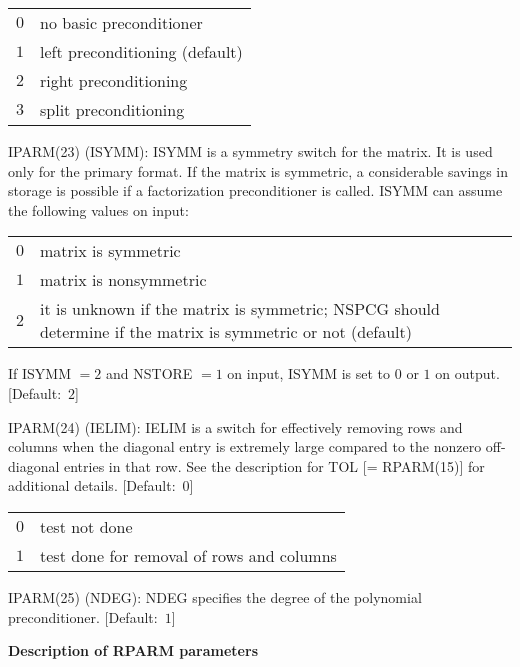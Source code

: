 \begin{list}{}{
               \leftmargin 1.00in \rightmargin 0.25in}
         \begin{tabular}{ll}
            $0$ & no basic preconditioner \\
            $1$ & left preconditioning (default) \\
            $2$ & right preconditioning   \\
            $3$ & split preconditioning
         \end{tabular}
 
\item[IPARM(23) \hfill](ISYMM):
         ISYMM is a symmetry switch for the matrix.  It is used
         only for the primary format.  If the matrix is symmetric,
         a considerable savings in storage is possible if a
         factorization preconditioner is called.  ISYMM can assume
         the following values on input:
 
         \begin{tabular}{lp{3.5in}}
           $0$ & matrix is symmetric \\
           $1$ & matrix is nonsymmetric \\
           $2$ & it is unknown if the matrix is symmetric; NSPCG
                 should determine if the matrix is symmetric or not
                 (default)
         \end{tabular}
 
         If ISYMM $= 2$ and NSTORE $= 1$ on input, ISYMM is set to
         $0$ or $1$ on output.  \mbox{[Default: $2$]}
 
\item[IPARM(24) \hfill](IELIM):
         IELIM is a switch for effectively removing rows and columns
         when the diagonal entry is extremely large compared to the
         nonzero off-diagonal entries in that row.  See the description
         for TOL [= RPARM(15)] for additional details.
         \mbox{[Default: $0$]}
 
         \begin{tabular}{ll}
           $0$ & test not done \\
           $1$ & test done for removal of rows and columns
         \end{tabular}
 
\item[IPARM(25) \hfill](NDEG):
         NDEG specifies the degree of the polynomial preconditioner.
         \mbox{[Default: $1$]}

\end{list}
 
\newpage
\bigskip
\noindent
{\bf Description of RPARM parameters}
\bigskip
 
